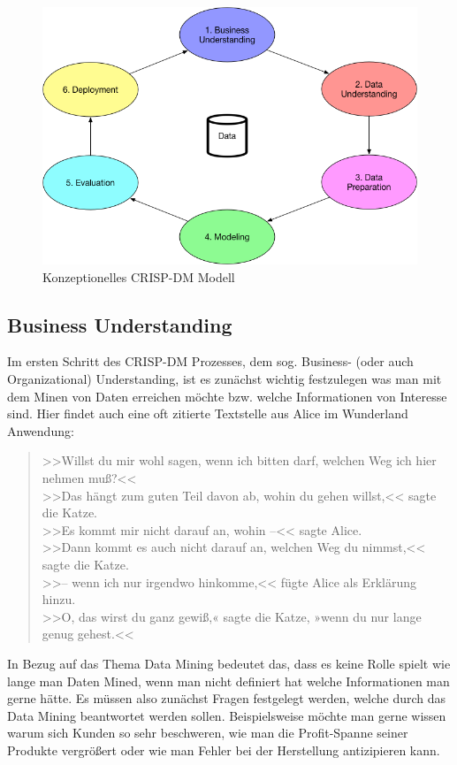 \begin{figure}[htb]
	\includegraphics[width=\textwidth]{gfx/CRISP-DM_Model.png}
	\caption{Konzeptionelles CRISP-DM Modell}
	\label{fig:process:crispdm}
\end{figure}



\subsection{Business Understanding}
\label{sec:process:crispdm:bu}

Im ersten Schritt des CRISP-DM Prozesses, dem sog. Business- (oder auch Organizational) Understanding,
ist es zunächst wichtig festzulegen was man mit dem Minen von Daten erreichen
möchte bzw. welche Informationen von Interesse sind. Hier findet auch eine oft
zitierte Textstelle aus Alice im Wunderland Anwendung:
\begin{quotation}
  >>Willst du mir wohl sagen, wenn ich bitten darf, welchen Weg ich hier nehmen muß?<< \\
  >>Das hängt zum guten Teil davon ab, wohin du gehen willst,<< sagte die Katze. \\
  >>Es kommt mir nicht darauf an, wohin –<< sagte Alice. \\
  >>Dann kommt es auch nicht darauf an, welchen Weg du nimmst,<< sagte die Katze. \\
  >>– wenn ich nur irgendwo hinkomme,<< fügte Alice als Erklärung hinzu. \\
  >>O, das wirst du ganz gewiß,« sagte die Katze, »wenn du nur lange genug gehest.<<
\end{quotation}
In Bezug auf das Thema Data Mining bedeutet das, dass es keine Rolle spielt wie
lange man Daten Mined, wenn
man nicht definiert hat welche Informationen man gerne hätte. Es müssen also
zunächst Fragen festgelegt werden, welche durch das Data Mining beantwortet
werden sollen. Beispielsweise möchte man gerne wissen warum sich Kunden so sehr
beschweren, wie man die Profit-Spanne seiner Produkte vergrößert oder wie man
Fehler bei der Herstellung antizipieren kann.

